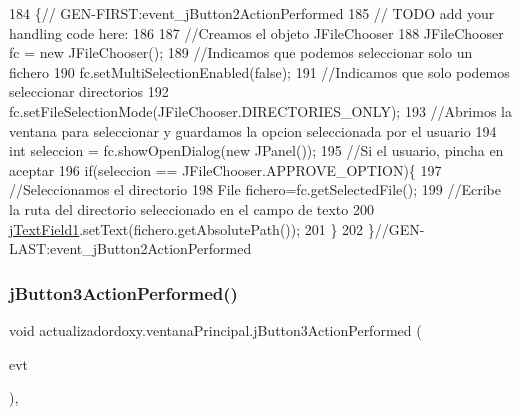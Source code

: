 \begin{DoxyCode}
184                                                                          \{\textcolor{comment}{//
      GEN-FIRST:event\_jButton2ActionPerformed}
185         \textcolor{comment}{// TODO add your handling code here:}
186         
187         \textcolor{comment}{//Creamos el objeto JFileChooser}
188         JFileChooser fc = \textcolor{keyword}{new} JFileChooser();
189         \textcolor{comment}{//Indicamos que podemos seleccionar solo un fichero}
190         fc.setMultiSelectionEnabled(\textcolor{keyword}{false});
191         \textcolor{comment}{//Indicamos que solo podemos seleccionar directorios}
192         fc.setFileSelectionMode(JFileChooser.DIRECTORIES\_ONLY);
193         \textcolor{comment}{//Abrimos la ventana para seleccionar y guardamos la opcion seleccionada por el usuario}
194         \textcolor{keywordtype}{int} seleccion = fc.showOpenDialog(\textcolor{keyword}{new} JPanel());
195         \textcolor{comment}{//Si el usuario, pincha en aceptar}
196         \textcolor{keywordflow}{if}(seleccion == JFileChooser.APPROVE\_OPTION)\{
197             \textcolor{comment}{//Seleccionamos el directorio}
198             File fichero=fc.getSelectedFile();
199             \textcolor{comment}{//Ecribe la ruta del directorio seleccionado en el campo de texto}
200             \mbox{\hyperlink{classactualizadordoxy_1_1ventana_principal_a0e2df794c32f58c41675cd579e38b5d0}{jTextField1}}.setText(fichero.getAbsolutePath());
201         \}
202     \}\textcolor{comment}{//GEN-LAST:event\_jButton2ActionPerformed}
\end{DoxyCode}
\mbox{\label{classactualizadordoxy_1_1ventana_principal_a714f4ea7e27667dfa242c579a2fdf6f1}} 
\subsubsection{\texorpdfstring{j\+Button3\+Action\+Performed()}{jButton3ActionPerformed()}}
{\footnotesize\ttfamily void actualizadordoxy.\+ventana\+Principal.\+j\+Button3\+Action\+Performed (\begin{DoxyParamCaption}\item[{java.\+awt.\+event.\+Action\+Event}]{evt }\end{DoxyParamCaption})\hspace{0.3cm}{\ttfamily [inline]}, {\ttfamily [private]}}


